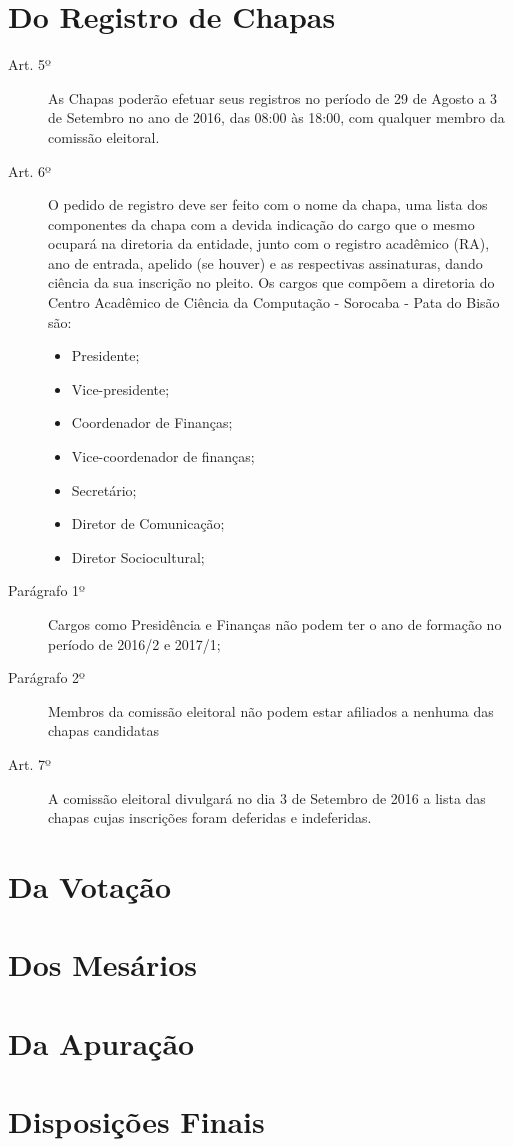 \documentclass[12pt]{article}
\newcommand\tab[1][1cm]{\hspace*{#1}}
\begin{document}
\section*{Do Registro de Chapas}
\begin{description}
	\item[Art. 5º] As Chapas poderão efetuar seus registros no período de 29 de Agosto a 3 de Setembro no ano de 2016, das 08:00 às 18:00, com qualquer membro da comissão eleitoral.
	\item[Art. 6º] O pedido de registro deve ser feito com o nome da chapa, uma lista dos componentes da chapa com a devida indicação do cargo que o mesmo ocupará na diretoria da entidade, junto com o registro acadêmico (RA), ano de entrada, apelido (se houver) e as respectivas assinaturas, dando ciência da sua inscrição no pleito.
Os cargos que compõem a diretoria do Centro Acadêmico de Ciência da Computação - Sorocaba - Pata do Bisão são:
\begin{itemize}	
	\item Presidente;
	\item Vice-presidente;
	\item Coordenador de Finanças;
	\item Vice-coordenador de finanças;
	\item Secretário;
        \item Diretor de Comunicação;
	\item Diretor Sociocultural;
\end{itemize}
	\tab \item[Parágrafo 1º] Cargos como Presidência e Finanças não podem ter o ano de formação no período de 2016/2 e 2017/1;
	\tab \item[Parágrafo 2º] Membros da comissão eleitoral não podem estar afiliados a nenhuma das chapas candidatas
	\item[Art. 7º] A comissão eleitoral divulgará no dia 3 de Setembro de 2016 a lista das chapas cujas inscrições foram deferidas e indeferidas.
\end{description}


\section*{Da Votação}

\section*{Dos Mesários}

\section*{Da Apuração}

\section*{Disposições Finais}
\end{document}
